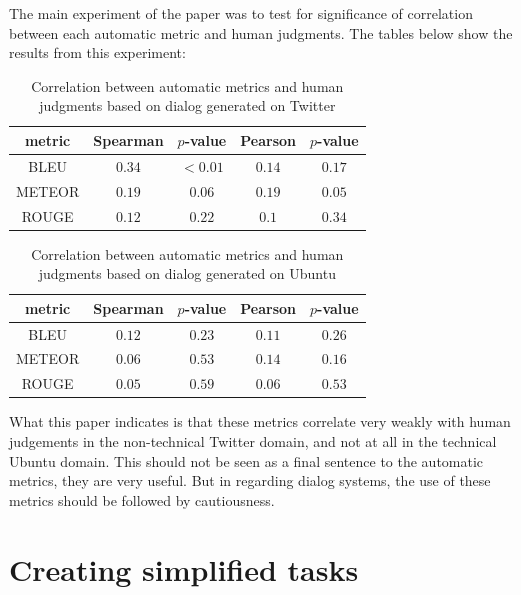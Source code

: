 The main experiment of the paper was to test for significance of correlation between each automatic metric and  human judgments. The tables below show the results from this experiment:


\begin{table}[h]
\centering
\label{hownottable}
\begin{tabular}{|c|c|c|c|c|}
\hline
\cellcolor{blue!10} metric & \cellcolor{blue!10} Spearman & \cellcolor{blue!10} $p$-value & \cellcolor{blue!10} Pearson &  \cellcolor{blue!10} $p$-value \\ \hline
BLEU   & $0.34$   & $< 0.01$  & $0.14$  & $0.17$ \\ \hline
METEOR & $0.19$   & $0.06$    & $0.19$  & $0.05$ \\ \hline
ROUGE  & $0.12$   & $0.22$    & $0.1$   & $0.34$ \\ \hline  
\end{tabular}
\caption{Correlation between automatic metrics and human judgments based on dialog generated on Twitter \cite{LiuLSNCP16}}
\end{table}


\begin{table}[h]
\centering
\label{hownottable}
\begin{tabular}{|c|c|c|c|c|}
\hline
\cellcolor{blue!10} metric & \cellcolor{blue!10} Spearman & \cellcolor{blue!10} $p$-value & \cellcolor{blue!10} Pearson &  \cellcolor{blue!10} $p$-value \\ \hline
BLEU & $0.12$   & $0.23$    & $0.11$  & $0.26$    \\ \hline
METEOR & $0.06$   & $0.53$    & $0.14$  & $0.16$     \\ \hline
ROUGE & $0.05$   & $0.59$    & $0.06$  & $0.53$    \\ \hline
\end{tabular}
\caption{Correlation between automatic metrics and human judgments based on dialog generated on Ubuntu \cite{LiuLSNCP16}}
\end{table}



What this paper indicates is that these metrics correlate very weakly with human judgements in the non-technical Twitter domain, and not at all in the technical Ubuntu domain. This should not be seen as a final sentence to the automatic metrics, they are very useful. But in regarding dialog systems, the use of these metrics should be followed by cautiousness.


\section{Creating simplified tasks}
\label{ch:03-tasks}

